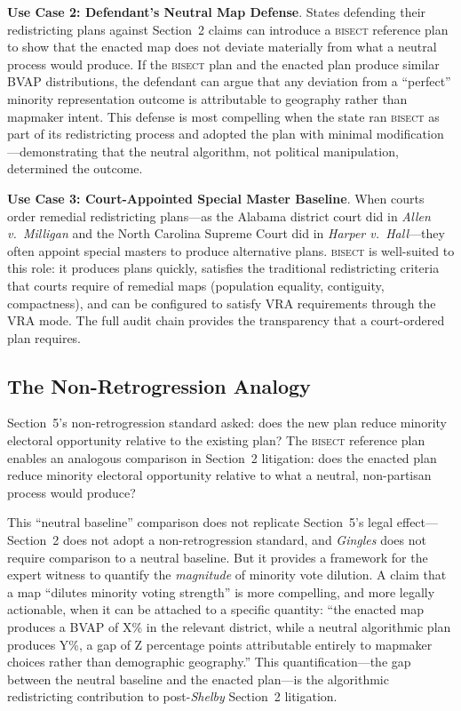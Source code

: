 \textbf{Use Case 2: Defendant's Neutral Map Defense}. States defending
their redistricting plans against Section~2 claims can introduce a
\textsc{bisect} reference plan to show that the enacted map does not
deviate materially from what a neutral process would produce. If the
\textsc{bisect} plan and the enacted plan produce similar BVAP
distributions, the defendant can argue that any deviation from a
``perfect'' minority representation outcome is attributable to geography
rather than mapmaker intent. This defense is most compelling when
the state ran \textsc{bisect} as part of its redistricting process
and adopted the plan with minimal modification---demonstrating that
the neutral algorithm, not political manipulation, determined the
outcome.

\textbf{Use Case 3: Court-Appointed Special Master Baseline}. When
courts order remedial redistricting plans---as the Alabama district court
did in \textit{Allen v.\ Milligan} and the North Carolina Supreme Court
did in \textit{Harper v.\ Hall}---they often appoint special masters
to produce alternative plans. \textsc{bisect} is well-suited to this
role: it produces plans quickly, satisfies the traditional redistricting
criteria that courts require of remedial maps (population equality,
contiguity, compactness), and can be configured to satisfy VRA
requirements through the VRA mode. The full audit chain provides
the transparency that a court-ordered plan requires.

\subsection{The Non-Retrogression Analogy}

Section~5's non-retrogression standard asked: does the new plan reduce
minority electoral opportunity relative to the existing plan? The
\textsc{bisect} reference plan enables an analogous comparison in
Section~2 litigation: does the enacted plan reduce minority electoral
opportunity relative to what a neutral, non-partisan process would produce?

This ``neutral baseline'' comparison does not replicate Section~5's
legal effect---Section~2 does not adopt a non-retrogression standard,
and \textit{Gingles} does not require comparison to a neutral baseline.
But it provides a framework for the expert witness to quantify the
\textit{magnitude} of minority vote dilution. A claim that a map
``dilutes minority voting strength'' is more compelling, and more
legally actionable, when it can be attached to a specific quantity:
``the enacted map produces a BVAP of X\% in the relevant district,
while a neutral algorithmic plan produces Y\%, a gap of Z percentage
points attributable entirely to mapmaker choices rather than demographic
geography.'' This quantification---the gap between the neutral baseline
and the enacted plan---is the algorithmic redistricting contribution
to post-\textit{Shelby} Section~2 litigation.
